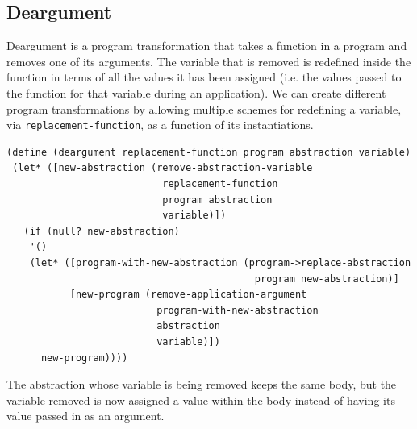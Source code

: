 \documentclass[a4paper,10pt]{article}
\begin{document}
\subsection{Deargument}
Deargument is a program transformation that takes a function in a program and removes one of its arguments.  The variable that is removed is redefined inside the function in terms of all the values it has been assigned (i.e. the values passed to the function for that variable during an application).  We can create different program transformations by allowing multiple schemes for redefining a variable, via \texttt{replacement-function},  as a function of its instantiations.  
\begin{lstlisting}[frame=trBL]
(define (deargument replacement-function program abstraction variable)
 (let* ([new-abstraction (remove-abstraction-variable 
                           replacement-function 
                           program abstraction 
                           variable)])
   (if (null? new-abstraction)
    '()
    (let* ([program-with-new-abstraction (program->replace-abstraction 
                                           program new-abstraction)]
           [new-program (remove-application-argument 
                          program-with-new-abstraction 
                          abstraction 
                          variable)])
      new-program))))
\end{lstlisting}
The abstraction whose variable is being removed keeps the same body, but the variable removed is now assigned a value  within the body instead of having its value passed in as an argument.
\end{document}
